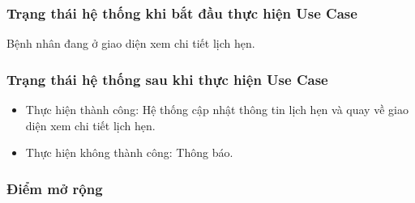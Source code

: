 \subsubsection{Trạng thái hệ thống khi bắt đầu thực hiện Use Case}
Bệnh nhân đang ở giao diện xem chi tiết lịch hẹn.

\subsubsection{Trạng thái hệ thống sau khi thực hiện Use Case}
\begin{itemize}
  \item Thực hiện thành công: Hệ thống cập nhật thông tin lịch hẹn và quay về giao diện xem chi tiết lịch hẹn.
  \item Thực hiện không thành công: Thông báo.
\end{itemize}

\subsubsection{Điểm mở rộng}